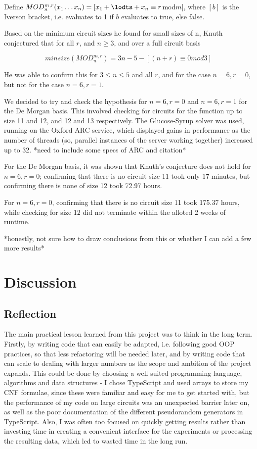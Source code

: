 \documentclass{article}
\begin{document}
Define $MOD^{m,r}_n(x_1 \ldots x_n) = [x_1 + \lodts + x_n \equiv r $mod$ m]$, where $[b]$ is the Iverson bracket, i.e. evaluates to 1 if $b$ evaluates to true, else false.

Based on the minimum circuit sizes he found for small sizes of n, Knuth conjectured that for all $r$, and $n \geq 3$, and over a full circuit basis

\[
  minsize(MOD^{m,r}_n) = 3n - 5 - [(n+r) \equiv 0 mod 3]  
\]

He was able to confirm this for $3 \leq n \leq 5$ and all $r$, and for the case $n=6, r=0$, but not for the case $n=6, r=1$.

We decided to try and check the hypothesis for $n=6, r=0$ and $n=6, r=1$ for the De Morgan basis. This involved checking for circuits for the function up to size 11 and 12, and 12 and 13 respectively. The Glucose-Syrup solver was used, running on the Oxford ARC service, which displayed gains in performance as the number of threads (so, parallel instances of the server working together) increased up to 32. *need to include some specs of ARC and citation*

For the De Morgan basis, it was shown that Knuth's conjecture does not hold for $n=6, r=0$; confirming that there is no circuit size 11 took only 17 minutes, but confirming there is none of size 12 took 72.97 hours.

For $n=6, r=0$, confirming that there is no circuit size 11 took 175.37 hours, while checking for size 12 did not terminate within the alloted 2 weeks of runtime.

*honestly, not sure how to draw conclusions from this or whether I can add a few more results*

\section{Discussion}

\subsection{Reflection}

The main practical lesson learned from this project was to think in the long term. Firstly, by writing code that can easily be adapted, i.e. following good OOP practices, so that less refactoring will be needed later, and by writing code that can scale to dealing with larger numbers as the scope and ambition of the project expands. This could be done by choosing a well-suited programming language, algorithms and data structures - I chose TypeScript and used arrays to store my CNF formulae, since these were familiar and easy for me to get started with, but the performance of my code on large circuits was an unexpected barrier later on, as well as the poor documentation of the different pseudorandom generators in TypeScript. Also, I was often too focused on quickly getting results rather than investing time in creating a convenient interface for the experiments or processing the resulting data, which led to wasted time in the long run.
\end{document}
